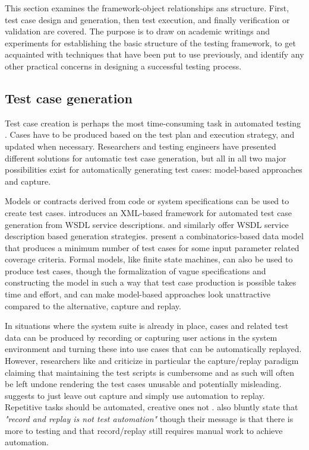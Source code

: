 \documentclass[12pt,a4paper,oneside,pdftex]{report}
\begin{document}
{This section examines the framework-object relationships ans structure. First, test case design and generation, then test execution, and finally verification or validation are covered. The purpose is to draw on academic writings and experiments for establishing the basic structure of the testing framework, to get acquainted with techniques that have been put to use previously, and identify any other practical concerns in designing a successful testing process.

\subsection{Test case generation}

Test case creation is perhaps the most time-consuming task in automated testing \citep{kit1999integrated}. Cases have to be produced based on the test plan and execution strategy, and updated when necessary. Researchers and testing engineers have presented different solutions for automatic test case generation, but all in all two major possibilities exist for automatically generating test cases: model-based approaches and capture.

Models or contracts derived from code or system specifications can be used to create test cases. \citet{tsai2002coyote} introduces an XML-based framework for automated test case generation from WSDL service descriptions. \citet{bai2005WSDL} and \citet{di2007web} similarly offer WSDL service description based generation strategies. \citet{dalal1999model} present a combinatorics-based data model that produces a minimum number of test cases for some input parameter related coverage criteria. Formal models, like finite state machines, can also be used to produce test cases, though the formalization of vague specifications and constructing the model in such a way that test case production is possible takes time and effort, and can make model-based approaches look unattractive compared to the alternative, capture and replay. 

In situations where the system suite is already in place, cases and related test data can be produced by recording or capturing user actions in the system environment and turning these into use cases that can be automatically replayed. However, researchers like \citet{zallar2001you} and \citet{kit1999integrated} criticize in particular the capture/replay paradigm claiming that maintaining the test scripts is cumbersome and as such will often be left undone rendering the test cases unusable and potentially misleading. \citet{kit1999integrated} suggests to just leave out capture and simply use automation to replay. Repetitive tasks should be automated, creative ones not \citep{pezze2008software}. \citet{fewster1999software} also bluntly state that \emph{"record and replay is not test automation"} though their message is that there is more to testing and that record/replay still requires manual work to achieve automation. 

}
\end{document}
